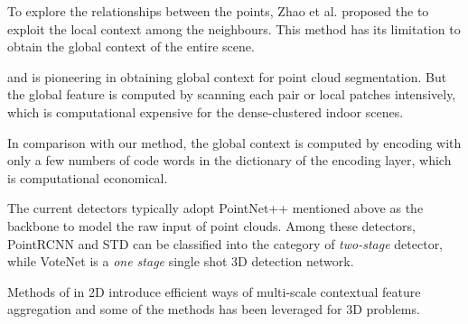 \documentclass[runningheads]{llncs}
\begin{document}

To explore the relationships between the  points, Zhao et al. proposed the \cite{pointweb} to exploit the local context among the neighbours. This method has its limitation to obtain the global context of the entire scene.

\cite{ppfnet} and  \cite{LG-PointNet++} is pioneering in obtaining global context for 
point cloud segmentation.  But the global feature is computed by scanning each pair or local patches intensively, which is computational expensive for the dense-clustered indoor scenes.


In comparison with our method,  the global context is computed by encoding with only a few numbers of code words in the dictionary of the encoding layer, which is computational economical.




The current detectors  \cite{VoteNet,PointRCNN,STD} typically adopt PointNet++  mentioned above as the backbone to model the raw input of point clouds. Among these detectors, PointRCNN \cite{PointRCNN} and STD \cite{STD} can be classified into the category of \emph{two-stage} detector, %
while VoteNet \cite{VoteNet} is a \emph{one stage} single shot 3D detection network. 



Methods of \cite{Deeplabv1,Deeplabv3,Deeplabv3+,DenseASPP,largekernel,SENet,encnet} in 2D introduce efficient ways of multi-scale contextual feature aggregation and some of the methods has been leveraged for  3D problems.
\end{document}
